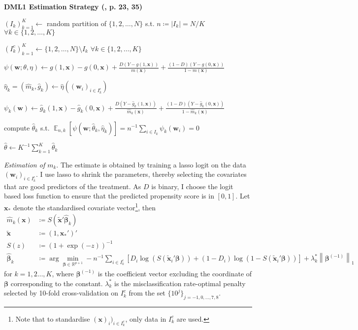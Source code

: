 \documentclass[a4paper,12pt]{article}
\DeclareMathOperator*{\E}{\mathbb{E}}
\newcommand{\Ebs}[2]{{\E}_{#1}\left[#2\right]}
\newcommand{\tld}[1]{\tilde{#1}}
\newcommand{\norm}[2]{\left\lVert{#2}\right\rVert_{#1}}
\newcommand{\ceq}{\coloneqq}  %
\newcommand{\real}{\mathbb{R}}
\begin{document}
\begin{algorithm}[H]
\caption{\textbf{DML1 Estimation Strategy (\cite{chernozhukov2016}, p. 23, 35)}}\label{alg:estim}
{\small
\begin{algorithmic}[1]

\State $(I_k)_{k=1}^K\gets$ random partition of $\{1,2,\ldots,N\}$ s.t. $n\ceq |I_k|=N/K$ $\forall k\in\{1,2,\ldots,K\}$

\State  $(I_k^c)_{k=1}^K\gets\{1,2,\ldots,N\}\setminus I_k$ $\forall k\in\{1,2,\ldots,K\}$

\State $\psi(\bm{w}; \theta, \eta)\gets g(1, \bm{x})-g(0, \bm{x})+\frac{D(Y-g(1,\bm{x}))}{m(\bm{x})}+\frac{(1-D)(Y-g(0,\bm{x}))}{1-m(\bm{x})}$ 


	\State $\hat{\eta}_k = (\hat{m}_k, \hat{g}_k) \gets \hat{\eta}((\bm{w}_i)_{i\in I_k^c})$ 
	
	\State $\psi_k(\bm{w})\gets \hat{g}_k(1, \bm{x})-\hat{g}_k(0, \bm{x})+\frac{D(Y-\hat{g}_k(1,\bm{x}))}{\hat{m}_k(\bm{x})}+\frac{(1-D)(Y-\hat{g}_k(0,\bm{x}))}{1-\hat{m}_k(\bm{x})}$	

	\State compute $\hat{\theta}_k$ s.t. $\Ebs{n,k}{\psi(\bm{w}; \hat{\theta}_k, \hat{\eta}_k)}={n}^{-1}\sum_{i\in I_k}\psi_k(\bm{w}_i)=0$
\EndFor

\State $\hat{\theta}\gets {K}^{-1}\sum_{k=1}^K\hat{\theta}_k$
\State \Return {$\hat{\theta}$}
\end{algorithmic}
}
\end{algorithm}

\noindent \textit{Estimation of $m_k$}. The estimate is obtained by training a lasso logit on the data $(\bm{w}_i)_{i\in I^c_k}$. I use lasso to shrink the parameters, thereby selecting the covariates that are good predictors of the treatment. As $D$ is binary, I choose the logit based loss function to ensure that the predicted propensity score is in $[0,1]$.
Let $\bm{x}_{*}$ denote the standardised covariate vector\footnote{Note that to standardise $(\bm{x})_i)_{i\in I_k^c}$, only data in $I_k^c$ are used.}, then
\begin{align*}
\hat{m}_k(\bm{x}) &\ceq S(\tld{\bm{x}}'\hat{\bm{\beta}}_k) \\
\tld{\bm{x}} &\ceq (1, \bm{x}_*')' \\
S(z) &\ceq (1+\exp(-z))^{-1} \\
\hat{\bm{\beta}}_k&\ceq \arg\min_{\bm{\beta}\in\real^{p+1}} -n^{-1}\sum_{i\in I^c_k}[D_i\log(S(\tld{\bm{x}}_{i}'\bm{\beta}))+(1-D_i)\log(1-S(\tld{\bm{x}}_i'\bm{\beta}))] +\lambda_k^* \norm{1}{\bm{\beta}^{(-1)}}
\end{align*}
for $k=1,2\ldots,K$, where $\bm{\beta}^{(-1)}$ is the coefficient vector excluding the coordinate of  $\bm{\beta}$ corresponding to the constant. $\lambda_k^*$ is the misclassification rate-optimal penalty selected by 10-fold cross-validation on $I^c_k$ from the set $\{10^j\}_{j=-1,0,\ldots,7,8}$.
\end{document}
